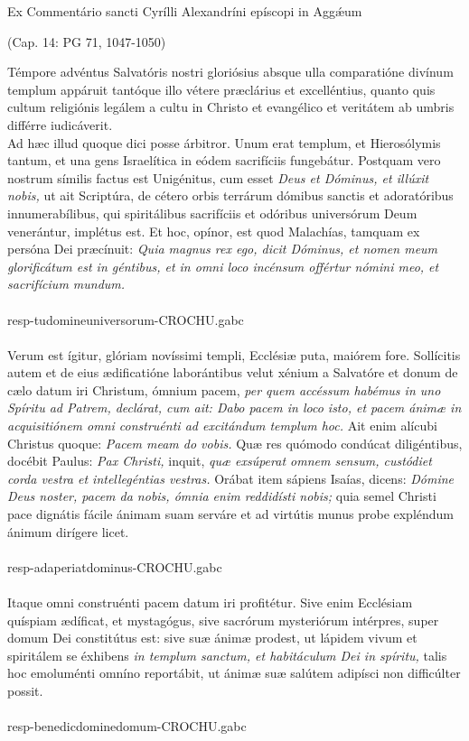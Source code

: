 \documentclass[options]{article}
\begin{document}
	Ex Commentário sancti Cyrílli Alexandríni epíscopi in Agg\'{æ}um 
	\begin{flushright}
		(Cap. 14: PG 71, 1047-1050)
	\end{flushright}
Témpore advéntus Salvatóris nostri gloriósius absque ulla comparatióne divínum templum appáruit tantóque illo vétere præclárius et excelléntius, quanto quis cultum religiónis legálem a cultu in Christo et evangélico et veritátem ab umbris différre iudicáverit.\\
Ad hæc illud quoque dici posse árbitror. Unum erat templum, et Hierosólymis tantum, et una gens Israelítica in eódem sacrifíciis fungebátur. Postquam vero nostrum símilis factus est Unigénitus, cum esset 
\emph{Deus et Dóminus, et illúxit nobis,}
 ut ait Scriptúra, de cétero orbis terrárum dómibus sanctis et adoratóribus innumerabílibus, qui spiritálibus sacrifíciis et odóribus universórum Deum venerántur, implétus est. Et hoc, opínor, est quod Malachías, tamquam ex persóna Dei præcínuit: 
 \emph{Quia magnus rex ego, dicit Dóminus, et nomen meum glorificátum est in géntibus, et in omni loco incénsum offértur nómini meo, et sacrifícium mundum.}\\
 \\
 resp-tudomineuniversorum-CROCHU.gabc\\
 \\
   Verum est ígitur, glóriam novíssimi templi, Ecclésiæ puta, maiórem fore. Sollícitis autem et de eius ædificatióne laborántibus velut xénium a Salvatóre et donum de cælo datum iri Christum, ómnium pacem,
   \emph{per quem accéssum habémus in uno Spíritu ad Patrem, declárat, cum ait: Dabo pacem in loco isto, et pacem ánimæ in acquisitiónem omni construénti ad excitándum templum hoc.}
   Ait enim alícubi Christus quoque: 
   \emph{Pacem meam do vobis.}
   Quæ res quómodo condúcat diligéntibus, docébit Paulus: 
   \emph{Pax Christi,}
   inquit, 
   \emph{quæ exsúperat omnem sensum, custódiet corda vestra et intellegéntias vestras.}
   Orábat item sápiens Isaías, dicens: 
   \emph{Dómine Deus noster, pacem da nobis, ómnia enim reddidísti nobis;}
   quia semel Christi pace dignátis fácile ánimam suam serváre et ad virtútis munus probe expléndum ánimum dirígere licet.\\
   \\
   resp-adaperiatdominus-CROCHU.gabc\\
   \\
     Itaque omni construénti pacem datum iri profitétur. Sive enim Ecclésiam quíspiam ædíficat, et mystagógus, sive sacrórum mysteriórum intérpres, super domum Dei constitútus est: sive suæ ánimæ prodest, ut lápidem vivum et spiritálem se éxhibens
   \emph{ in templum sanctum, et habitáculum Dei in spíritu,}
   talis hoc emoluménti omníno reportábit, ut ánimæ suæ salútem adipísci non difficúlter possit.\\
   \\
   
   
   resp-benedicdominedomum-CROCHU.gabc
   
    
\end{document}
